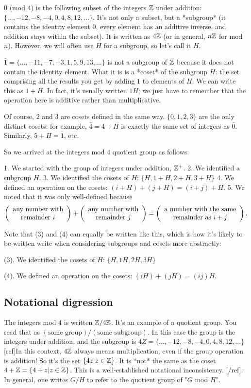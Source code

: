 $\bar 0$ (mod $4$) is the following subset of the integers $\mathbb{Z}$ under addition:
$\{\ldots, -12, -8, -4, 0, 4, 8, 12, \ldots\}$. It's not only a subset, but a
*subgroup* (it contains the identity element $0$, every element has an additive
inverse, and addition stays within the subset). It is written as $4\mathbb{Z}$ (or in
general, $n\mathbb{Z}$ for mod $n$). However, we will often use $H$ for a subgroup, so
let's call it $H$.

$\bar 1 = \{\ldots, -11, -7, -3, 1, 5, 9, 13, \ldots\}$ is not a subgroup of
$\mathbb{Z}$ because it does not contain the identity element. What it is is a *coset*
of the subgroup $H$: the set comprising all the results you get by adding $1$
to elements of $H$. We can write this as $1 + H$. In fact, it's usually written
$1H$; we just have to remember that the operation here is additive rather than
multiplicative.

Of course, $\bar 2$ and $\bar 3$ are cosets defined in the same way. $\{\bar 0,
\bar 1, \bar 2, \bar 3\}$ are the only distinct cosets: for example, $\bar 4 =
4+H$ is exactly the same set of integers as $\bar 0$. Similarly, $5 + H = \bar
1$, etc.

So we arrived at the integers mod $4$ quotient group as follows:

1. We started with the group of integers under addition, $\mathbb{Z}^+$.
2. We identified a subgroup $H$.
3. We identified the cosets of $H$: $\{H, 1+H, 2+H, 3+H\}$
4. We defined an operation on the cosets: $(i+H) + (j+H) = (i+j)+H$.
5. We noted that it was only well-defined because
  $$
  \left(\begin{array}{c} \text{any number with} \\ \text{remainder $i$} \end{array}\right) +
  \left(\begin{array}{c} \text{any number with} \\ \text{remainder $j$} \end{array}\right) =
  \left(\begin{array}{c} \text{a number with the same} \\ \text{remainder as $i+j$} \end{array}\right).
  $$

Note that (3) and (4) can equally be written like this, which is how it's
likely to be written write when considering subgroups and cosets more
abstractly:

(3). We identified the cosets of $H$: $\{H, 1H, 2H, 3H\}$

(4). We defined an operation on the cosets: $(iH) + (jH) = (ij)H$.


\subsection{Notational digression}

The integers mod $4$ is written $\mathbb{Z}/4\mathbb{Z}$. It's an example of a quotient
group. You read that as $(\text{some group}) / (\text{some subgroup})$. In this
case the group is the integers under addition, and the subgroup is $4Z =
\{\ldots, -12, -8, -4, 0, 4, 8, 12, \ldots\}$[ref]In this context, $4\mathbb{Z}$ always
means multiplication, even if the group operation is addition! So it's the set
$\{4z|z \in \mathbb{Z}\}$. It is *not* the same as the coset $4 + \mathbb{Z} = \{4+z|z \in
\mathbb{Z}\}$. This is a well-established notational inconsistency. [/ref]. In general,
one writes $G/H$ to refer to the quotient group of "$G$ mod $H$".


